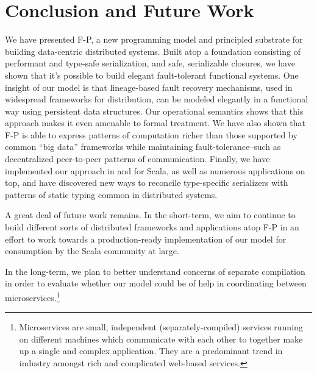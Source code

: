 \documentclass[preprint]{sigplanconf}
\theoremstyle{definition}
\theoremstyle{definition}
\begin{document}


\section{Conclusion and Future Work}
\label{sec:conclusion-future-work}

We have presented F-P, a new programming model and principled substrate for
building data-centric distributed systems. Built atop a foundation consisting
of performant and type-safe serialization, and safe, serializable closures, we
have shown that it's possible to build elegant fault-tolerant functional
systems. One insight of our model is that lineage-based fault recovery
mechanisms, used in widespread frameworks for distribution, can be modeled
elegantly in a functional way using persistent data structures. Our
operational semantics shows that this approach makes it even amenable to
formal treatment. We have also shown that F-P is able to express patterns of
computation richer than those supported by common ``big data'' frameworks
while maintaining fault-tolerance--such as decentralized peer-to-peer patterns
of communication.  Finally, we have implemented our approach in and for Scala,
as well as numerous applications on top, and have discovered new ways to
reconcile type-specific serializers with patterns of static typing common in
distributed systems.

A great deal of future work remains. In the short-term, we aim to continue to
build different sorts of distributed frameworks and applications atop F-P in
an effort to work towards a production-ready implementation of our model for
consumption by the Scala community at large.

In the long-term, we plan to better understand concerns of separate
compilation in order to evaluate whether our model could be of help in
coordinating between microservices.\footnote{Microservices are small,
independent (separately-compiled) services running on different machines which
communicate with each other to together make up a single and complex
application. They are a predominant trend in industry amongst rich and
complicated web-based services.}


\end{document}

